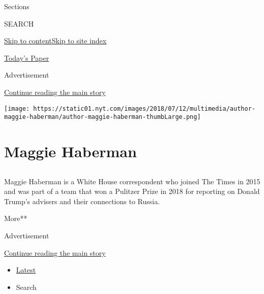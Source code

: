Sections

SEARCH

\protect\hyperlink{site-content}{Skip to
content}\protect\hyperlink{site-index}{Skip to site index}

\href{https://myaccount.nytimes.com/auth/login?response_type=cookie\&client_id=vi}{}

\href{https://www.nytimes.com/section/todayspaper}{Today's Paper}

Advertisement

\protect\hyperlink{after-top}{Continue reading the main story}

\texttt{[image: https://static01.nyt.com/images/2018/07/12/multimedia/author-maggie-haberman/author-maggie-haberman-thumbLarge.png]}

\hypertarget{maggie-haberman}{%
\section{Maggie Haberman}\label{maggie-haberman}}

\hypertarget{section}{%
\subsection{}\label{section}}

Maggie Haberman is a White House correspondent who joined The Times in
2015 and was part of a team that won a Pulitzer Prize in 2018 for
reporting on Donald Trump's advisers and their connections to Russia.

More**

Advertisement

\protect\hyperlink{after-mid1}{Continue reading the main story}

\begin{itemize}
\tightlist
\item
  \protect\hyperlink{stream-panel}{Latest}
\item
  Search
\end{itemize}

